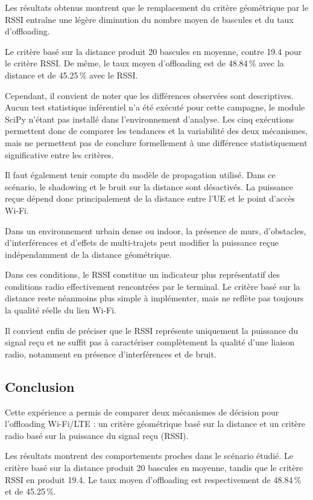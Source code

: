 Les résultats obtenus montrent que le remplacement du
critère géométrique par le RSSI entraîne une légère
diminution du nombre moyen de bascules et du taux
d'offloading.

Le critère basé sur la distance produit 20 bascules en
moyenne, contre 19.4 pour le critère RSSI. De même, le
taux moyen d'offloading est de 48.84\,\% avec la distance
et de 45.25\,\% avec le RSSI.

Cependant, il convient de noter que les différences
observées sont descriptives. Aucun test statistique
inférentiel n'a été exécuté pour cette campagne, le
module SciPy n'étant pas installé dans l'environnement
d'analyse. Les cinq exécutions permettent donc de
comparer les tendances et la variabilité des deux
mécanismes, mais ne permettent pas de conclure
formellement à une différence statistiquement
significative entre les critères.

Il faut également tenir compte du modèle de propagation
utilisé. Dans ce scénario, le shadowing et le bruit
sur la distance sont désactivés. La puissance reçue
dépend donc principalement de la distance entre l'UE
et le point d'accès Wi-Fi.

Dans un environnement urbain dense ou indoor, la
présence de murs, d'obstacles, d'interférences et
d'effets de multi-trajets peut modifier la puissance
reçue indépendamment de la distance géométrique.

Dans ces conditions, le RSSI constitue un indicateur
plus représentatif des conditions radio effectivement
rencontrées par le terminal. Le critère basé sur la
distance reste néanmoins plus simple à implémenter,
mais ne reflète pas toujours la qualité réelle du
lien Wi-Fi.

Il convient enfin de préciser que le RSSI représente
uniquement la puissance du signal reçu et ne suffit
pas à caractériser complètement la qualité d'une
liaison radio, notamment en présence d'interférences
et de bruit.

\subsection{Conclusion}

Cette expérience a permis de comparer deux mécanismes
de décision pour l'offloading Wi-Fi/LTE : un critère
géométrique basé sur la distance et un critère radio
basé sur la puissance du signal reçu (RSSI).

Les résultats montrent des comportements proches dans
le scénario étudié. Le critère basé sur la distance
produit 20 bascules en moyenne, tandis que le critère
RSSI en produit 19.4. Le taux moyen d'offloading est
respectivement de 48.84\,\% et de 45.25\,\%.

